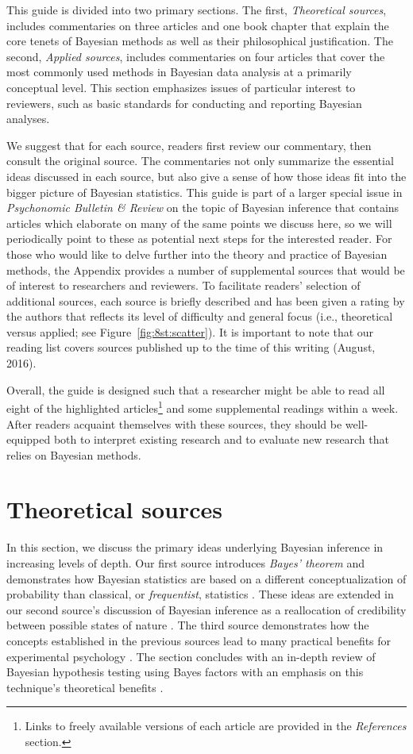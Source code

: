 This guide is divided into two primary sections.  The first, \emph{Theoretical sources}, includes commentaries on three articles and one book chapter that explain the core tenets of Bayesian methods as well as their philosophical justification. The second, \emph{Applied sources}, includes commentaries on four articles that cover the most commonly used methods in Bayesian data analysis at a primarily conceptual level. This section emphasizes issues of particular interest to reviewers, such as basic standards for conducting and reporting Bayesian analyses.  

We suggest that for each source, readers first review our commentary, then consult the original source.  The commentaries not only summarize the essential ideas discussed in each source, but also give a sense of how those ideas fit into the bigger picture of Bayesian statistics. This guide is part of a larger special issue in \textit{Psychonomic Bulletin \& Review} on the topic of Bayesian inference that contains articles which elaborate on many of the same points we discuss here, so we will periodically point to these as potential next steps for the interested reader. For those who would like to delve further into the theory and practice of Bayesian methods, the Appendix provides a number of supplemental sources that would be of interest to researchers and reviewers.  To facilitate readers' selection of additional sources, each source is briefly described and has been given a rating by the authors that reflects its level of difficulty and general focus (i.e., theoretical versus applied; see Figure~\ref{fig:8st:scatter}).  It is important to note that our reading list covers sources published up to the time of this writing (August, 2016). 

Overall, the guide is designed such that a researcher might be able to read all eight of the highlighted articles\footnote{Links to freely available versions of each article are provided in the \textit{References} section.} and some supplemental readings within a week.  After readers acquaint themselves with these sources, they should be well-equipped both to interpret existing research and to evaluate new research that relies on Bayesian methods. 

\section{Theoretical sources}
In this section, we discuss the primary ideas underlying Bayesian inference in increasing levels of depth.  Our first source introduces \emph{Bayes' theorem} and demonstrates how Bayesian statistics are based on a different conceptualization of probability than classical, or \textit{frequentist}, statistics \cite{Lindley1993}. These ideas are extended in our second source's discussion of Bayesian inference as a reallocation of credibility between possible states of nature \cite{Kruschke2015doing}.  The third source demonstrates how the concepts established in the previous sources lead to many practical benefits for experimental psychology \cite{Dienes2011}. The section concludes with an in-depth review of Bayesian hypothesis testing using Bayes factors with an emphasis on this technique's theoretical benefits \cite{rouder2009bayesian}. 

